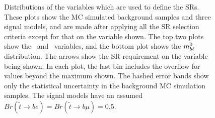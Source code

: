 \begin{figure}
  \centering
  \caption{Distributions of the variables which are used to define the SRs.
    These plots show the MC simulated background samples and three signal
    models, and are made after applying all the SR selection criteria except for
    that on the variable shown.
    The top two plots show the \HT\ and \MBLASYM\ variables, and the bottom
    plot shows the $m_{b\ell}^0$ distribution.
    The arrows show the SR requirement on the variable being shown.
    In each plot, the last bin includes the overflow for values beyond the
    maximum shown.
    The hashed error bands show only the statistical uncertainty in the
    background MC simulation samples.
    The signal models have an assumed
    $Br(\tilde{t}\rightarrow be) = Br(\tilde{t}\rightarrow b\mu) = 0.5$.
  }
  \label{fig:n_minus_one_sr}
\end{figure}

